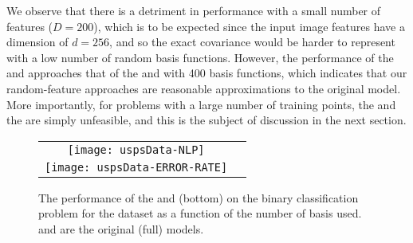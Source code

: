 We observe that there is a detriment in performance with a small 
number of features ($D=200$),  which is to be expected since the input image 
features have a dimension of $d = 256$, and so
the exact covariance would be harder to represent with a low number of random
basis functions. 
However, the performance of the
\eks and \uks approaches that of the \ugp and \egp with 400 basis functions,
which indicates that our random-feature approaches are reasonable approximations to
the original \gp model. More importantly, for problems with a large number of training 
points, the \egp and the \ugp are simply unfeasible, and this is the subject of discussion 
in the next section.
\begin{figure}[t]
\centering
\begin{tabular}{c c}
\texttt{[image: uspsData-NLP]}  \\
\texttt{[image: uspsData-ERROR-RATE]}  
\end{tabular}
\caption{The performance of the \eks and \uks (bottom) on the binary classification problem for the \usps dataset as a function of 
the number of  basis used. \egp and \ugp are the original (full) \gp models.
\label{fig:usps}
}
\end{figure}
%
 



 
